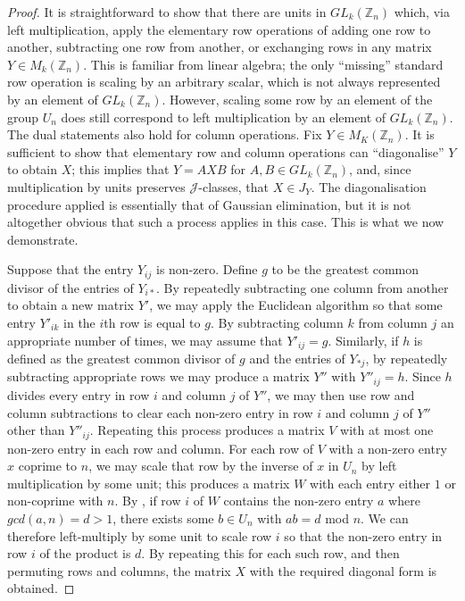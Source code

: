 \documentclass[11pt]{article}
\numberwithin{equation}{section}
\newcommand{\J}{\mathscr{J}}
\newcommand{\Z}{\mathbb{Z}}
\begin{document}
\begin{proof}
  It is straightforward to show that there are units in $GL_k(\Z_n)$ which, via
  left multiplication, apply the elementary row operations of adding one row to
  another, subtracting one row from another, or exchanging rows in any matrix $Y
  \in M_k(\Z_n)$. This is familiar from linear algebra; the only ``missing''
  standard row operation is scaling by an arbitrary scalar, which is not
  always represented by an element of $GL_k(\Z_n)$. However, scaling some row by
  an element of the group $U_n$ does still correspond to left multiplication by
  an element of $GL_k(\Z_n)$. The dual statements also hold for column operations.
  Fix $Y \in M_K(\Z_n)$. It is sufficient to show that elementary row and column operations
  can ``diagonalise'' $Y$ to obtain $X$; this implies that $Y = AXB$ for $A,
  B \in GL_k(\Z_n)$, and, since multiplication by units preserves $\J$-classes,
  that $X \in J_Y$.
  The diagonalisation procedure applied is essentially that of Gaussian
  elimination, but it is not altogether obvious that such a process applies in
  this case. This is what we now demonstrate.

  Suppose that the entry $Y_{ij}$ is non-zero. Define $g$ to be the greatest
  common divisor of the entries of $Y_{i*}$. By repeatedly subtracting one
  column from another to obtain a new matrix $Y'$, we may apply the Euclidean
  algorithm so that some entry $Y'_{ik}$ in the $i$th row is equal to $g$. By
  subtracting column $k$ from column $j$ an appropriate number of times, we may
  assume that $Y'_{ij} = g$. Similarly, if $h$ is defined as the greatest common
  divisor of $g$ and the entries of $Y_{*j}$, by repeatedly subtracting
  appropriate rows we may produce a matrix $Y''$ with $Y''_{ij} = h$. Since $h$
  divides every entry in row $i$ and column $j$ of $Y''$, we may then use row and
  column subtractions to clear each non-zero entry in row $i$ and column $j$ of
  $Y''$ other than $Y''_{ij}$. Repeating this process produces a matrix $V$ with
  at most one non-zero entry in each row and column. For each row of $V$ with a
  non-zero entry $x$ coprime to $n$, we may scale that row by the inverse of $x$
  in $U_n$ by left multiplication by some unit; this produces a matrix $W$ with
  each entry either $1$ or non-coprime with $n$. By ,
  if row $i$ of $W$ contains the non-zero entry $a$ where $gcd(a, n) = d > 1$,
  there exists some $b \in U_n$ with $ab = d$ mod $n$. We can therefore
  left-multiply by some unit to scale row $i$ so that the non-zero entry in row
  $i$ of the product is $d$. By repeating this for each such row, and then
  permuting rows and columns, the matrix $X$ with the required diagonal form is
  obtained.
\end{proof}
\end{document}
